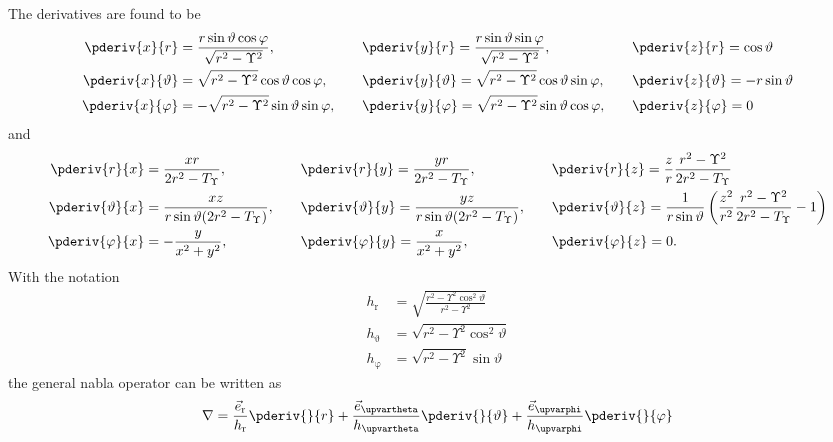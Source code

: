 The derivatives are found to be
\begin{equation}\label{Eq2:dXdProlateSphericalCoordinates}
\begin{alignedat}{4}
	\pderiv{x}{r} &= \frac{r\sin\vartheta\cos\varphi}{\sqrt{r^2-\Upsilon^2}},\qquad	&&\pderiv{y}{r} = \frac{r\sin\vartheta\sin\varphi}{\sqrt{r^2-\Upsilon^2}},\qquad	&&\pderiv{z}{r} = \cos\vartheta\\
	\pderiv{x}{\vartheta} &=\sqrt{r^2-\Upsilon^2}\cos\vartheta\cos\varphi,\qquad	&&\pderiv{y}{\vartheta} = \sqrt{r^2-\Upsilon^2}\cos\vartheta\sin\varphi,\qquad	&&\pderiv{z}{\vartheta} = -r\sin\vartheta\\
	\pderiv{x}{\varphi} &= -\sqrt{r^2-\Upsilon^2}\sin\vartheta\sin\varphi,\qquad	&&\pderiv{y}{\varphi} = \sqrt{r^2-\Upsilon^2}\sin\vartheta\cos\varphi,\qquad	&&\pderiv{z}{\varphi} =0
\end{alignedat}
\end{equation}
and
\begin{equation}\label{Eq2:dProlateSphericalCoordinatesdX}
\begin{alignedat}{4}
	\pderiv{r}{x} &= \frac{xr}{2r^2-T_\Upsilon},\qquad	&&\pderiv{r}{y} = \frac{yr}{2r^2-T_\Upsilon},\qquad	&&\pderiv{r}{z} = \frac{z}{r}\frac{r^2-\Upsilon^2}{2r^2-T_\Upsilon}\\
	\pderiv{\vartheta}{x} &= \frac{xz}{r\sin\vartheta (2r^2-T_\Upsilon)},\qquad	&&\pderiv{\vartheta}{y} = \frac{yz}{r\sin\vartheta (2r^2-T_\Upsilon)},\qquad	&&\pderiv{\vartheta}{z} = \frac{1}{r\sin\vartheta}\left(\frac{z^2}{r^2}\frac{r^2-\Upsilon^2}{2r^2-T_\Upsilon}-1\right)\\
	\pderiv{\varphi}{x} &= -\frac{y}{x^2+y^2},\qquad	&&\pderiv{\varphi}{y} = \frac{x}{x^2+y^2},\qquad	&&\pderiv{\varphi}{z} = 0.
\end{alignedat}
\end{equation}
With the notation
\begin{align*}
	h_{\mathrm{r}} &= \sqrt{\frac{r^2-\Upsilon^2\cos^2\vartheta}{r^2-\Upsilon^2}}\\
	h_{\upvartheta} &= \sqrt{r^2-\Upsilon^2\cos^2\vartheta}\\
	h_{\upvarphi} &= \sqrt{r^2-\Upsilon^2}\sin\vartheta	
\end{align*}
the general nabla operator can be written as
\begin{equation*}
	\nabla = \frac{\vec{e}_{\mathrm{r}}}{h_{\mathrm{r}}} \pderiv{}{r} + \frac{\vec{e}_{\upvartheta}}{h_{\upvartheta}} \pderiv{}{\vartheta} + \frac{\vec{e}_{\upvarphi}}{h_{\upvarphi}} \pderiv{}{\varphi}
\end{equation*}
